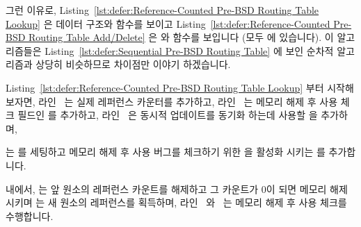 \fi

그런 이유로,
Listing~\ref{lst:defer:Reference-Counted Pre-BSD Routing Table Lookup}
은 데이터 구조와  함수를 보이고
Listing~\ref{lst:defer:Reference-Counted Pre-BSD Routing Table Add/Delete}
은  와  함수를 보입니다 (모두
 에 있습니다).
이 알고리즘들은
Listing~\ref{lst:defer:Sequential Pre-BSD Routing Table}
에 보인 순차적 알고리즘과 상당히 비슷하므로 차이점만 이야기 하겠습니다.

\begin{fcvref}
Listing~\ref{lst:defer:Reference-Counted Pre-BSD Routing Table Lookup}
부터 시작해 보자면, 라인~ 는 실제 레퍼런스 카운터를 추가하고,
라인~ 는 메모리 해제 후 사용 체크 필드인  를
추가하고, 라인~ 은 동시적 업데이트를 동기화 하는데 사용할
 을 추가하며,
\end{fcvref}
\begin{fcvref}
 는  를 세팅하고 메모리 해제 후 사용 버그를
체크하기 위한  을 활성화 시키는  를
추가합니다.
\end{fcvref}
\begin{fcvref}
 내에서,  는 앞 원소의
레퍼런스 카운트를 해제하고 그 카운트가 0이 되면 메모리 해제시키며
 는 새 원소의 레퍼런스를 획득하며,
라인~ 와~ 는 메모리 해제 후 사용 체크를
수행합니다.
\end{fcvref}

\iffalse

